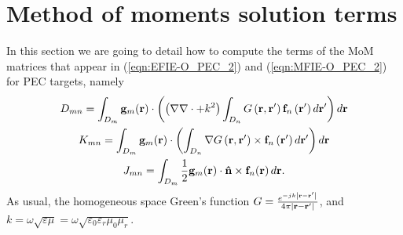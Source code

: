 \chapter{Method of moments solution terms}
\label{annex:MoM}

%
\par
In this section we are going to detail how to compute the terms of the MoM matrices that appear in (\ref{eqn:EFIE-O_PEC_2}) and (\ref{eqn:MFIE-O_PEC_2}) for PEC targets, namely
\begin{gather} 
D_{mn} = \int_{D_m}\mathbf{g}_m \!\left(\mathbf{r}\right) \cdot \left( \left(\nabla \nabla \cdot + k^2\right) \int_{D_n} G\left(\mathbf{r}, \mathbf{r}'\right) \mathbf{f}_n\left(\mathbf{r}'\right) d\mathbf{r}' \right) d\mathbf{r} \label{eqn:MoM terms I_1}\\
K_{mn} = \int_{D_m} \mathbf{g}_m \!\left(\mathbf{r}\right) \cdot \left(\int_{D_n} \nabla G\left(\mathbf{r}, \mathbf{r}'\right) \times \mathbf{f}_n\left(\mathbf{r}'\right) d\mathbf{r}'\right) d\mathbf{r} \label{eqn:MoM terms I_2}\\
J_{mn} = \int_{D_m} \frac{1}{2} \mathbf{g}_m \!\left(\mathbf{r}\right) \cdot \mathbf{\hat{n}} \times \mathbf{f}_{n}\!\left(\mathbf{r}\right)d\mathbf{r}. \label{eqn:MoM terms I_3}
\end{gather}
As usual, the homogeneous space Green's function $G = \frac{e^{-jk\left|\mathbf{r}-\mathbf{r}' \right|}}{4 \pi \left|\mathbf{r}-\mathbf{r}' \right|}$, and $k = \omega \sqrt{\varepsilon \mu} = \omega \sqrt{\varepsilon_0 \varepsilon_r \mu_0 \mu_r}$.

